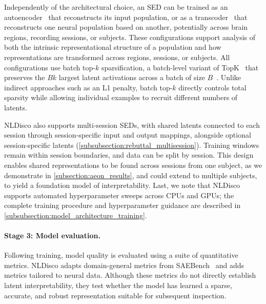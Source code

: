 Independently of the architectural choice, an SED can be trained as an autoencoder~\citep{cunningham_2023_saes} that reconstructs its input population, or as a transcoder~\citep{dunefsky_2024_transcoders} that reconstructs one neural population based on another, potentially across brain regions, recording sessions, or subjects. These configurations support analysis of both the intrinsic representational structure of a population and how representations are transformed across regions, sessions, or subjects. All configurations use batch top-$k$ sparsification, a batch-level variant of TopK~\citep{gao_2025_topk_saes} that preserves the $Bk$ largest latent activations across a batch of size $B$~\citep{bussmann_2024_batchtopk}. Unlike indirect approaches such as an L1 penalty, batch top-$k$ directly controls total sparsity while allowing individual examples to recruit different numbers of latents.

NLDisco also supports multi-session SEDs, with shared latents connected to each session through session-specific input and output mappings, alongside optional session-specific latents (\hyperref[subsubsection:rebuttal_multisession]{\ref*{subsubsection:rebuttal_multisession}}). Training windows remain within session boundaries, and data can be split by session. This design enables shared representations to be found across sessions from one subject, as we demonstrate in \hyperref[subsection:aeon_results]{\ref*{subsection:aeon_results}}, and could extend to multiple subjects, to yield a foundation model of interpretability. Last, we note that NLDisco supports automated hyperparameter sweeps across CPUs and GPUs; the complete training procedure and hyperparameter guidance are described in \hyperref[subsubsection:model_architecture_training]{\ref*{subsubsection:model_architecture_training}}.

\paragraph{Stage 3: Model evaluation.}

Following training, model quality is evaluated using a suite of quantitative metrics. NLDisco adapts domain-general metrics from SAEBench~\citep{karvonen_2025_saebench} and adds metrics tailored to neural data. Although these metrics do not directly establish latent interpretability, they test whether the model has learned a sparse, accurate, and robust representation suitable for subsequent inspection.

